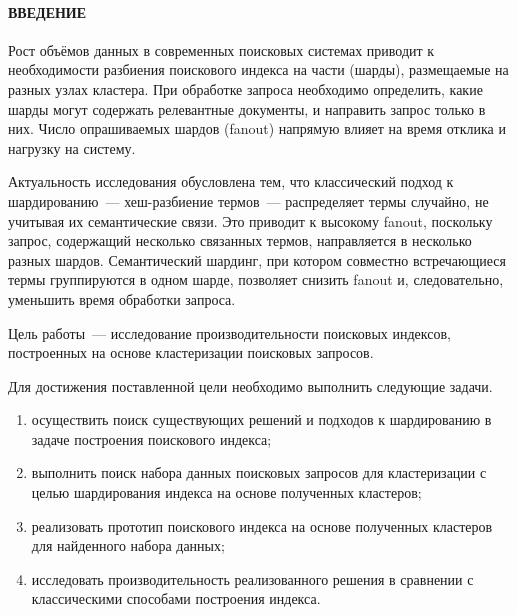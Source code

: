 \documentclass[14pt, a4paper]{article}
\newcommand{\reportheader}[1]{%
	\phantomsection%
	\clearpage
	\paragraph*{{#1}}%
	\addcontentsline{toc}{section}{#1}%
}
\begin{document}
	

	\tableofcontents
	\clearpage
	\reportheader{ВВЕДЕНИЕ}

	Рост объёмов данных в современных поисковых системах приводит к необходимости разбиения поискового индекса на части (шарды), размещаемые на разных узлах кластера.
	При обработке запроса необходимо определить, какие шарды могут содержать релевантные документы, и направить запрос только в них.
	Число опрашиваемых шардов (fanout) напрямую влияет на время отклика и нагрузку на систему.

	Актуальность исследования обусловлена тем, что классический подход к шардированию~--- хеш-разбиение термов~--- распределяет термы случайно, не учитывая их семантические связи.
	Это приводит к высокому fanout, поскольку запрос, содержащий несколько связанных термов, направляется в несколько разных шардов.
	Семантический шардинг, при котором совместно встречающиеся термы группируются в одном шарде, позволяет снизить fanout и, следовательно, уменьшить время обработки запроса.

	Цель работы~--- исследование производительности поисковых индексов, построенных на основе кластеризации поисковых запросов.

	Для достижения поставленной цели необходимо выполнить следующие задачи.
	\begin{enumerate}
		\item осуществить поиск существующих решений и подходов к шардированию в задаче построения поискового индекса;
		\item выполнить поиск набора данных поисковых запросов для кластеризации с целью шардирования индекса на основе полученных кластеров;
		\item реализовать прототип поискового индекса на основе полученных кластеров для найденного набора данных;
		\item исследовать производительность реализованного решения в сравнении с классическими способами построения индекса.
	\end{enumerate}
\end{document}
